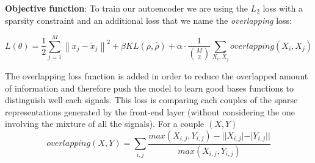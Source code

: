 \documentclass[master, tikz, final,11pt, dvipdfmx]{iscs-thesis}
\newcommand{\norm}[1]{\left\lVert#1\right\rVert}
\begin{document}
\textbf{Objective function}: To train our autoencoder we are using the $L_2$ loss with a sparsity constraint and an additional loss that we name the \textit{overlapping} loss:

\[L(\theta) = \frac{1}{2}\sum_{j=1}^{M}{\norm{x_j - \tilde{x}_j}}^2 + \beta KL(\rho, \hat{\rho}) + \alpha \cdot \frac{1}{\binom{M}{2}} \sum_{X_i,X_j}overlapping(X_i, X_j)\]

The overlapping loss function is added in order to reduce the overlapped amount of information and therefore push the model to learn good bases functions to distinguish well each signals. This loss is comparing each couples of the sparse representations generated by the front-end layer (without considering the one involving the mixture of all the signals). For a couple $(X,Y)$
\[overlapping(X, Y) = \sum_{i,j} \frac{max(X_{i,j},Y_{i,j})-||X_{i,j}|-|Y_{i,j}||}{max(X_{i,j},Y_{i,j})} \] 
\end{document}
